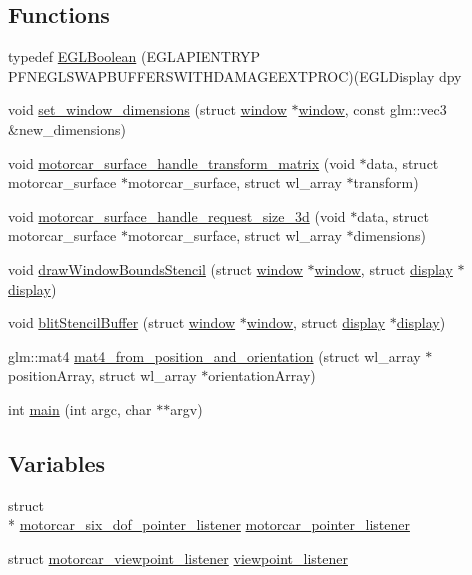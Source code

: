 \subsection*{Functions}
\begin{DoxyCompactItemize}
\item 
typedef \hyperlink{simple-egl_8cpp_ab4ad070d3bf82abe5e70330578f67893}{E\-G\-L\-Boolean} (E\-G\-L\-A\-P\-I\-E\-N\-T\-R\-Y\-P P\-F\-N\-E\-G\-L\-S\-W\-A\-P\-B\-U\-F\-F\-E\-R\-S\-W\-I\-T\-H\-D\-A\-M\-A\-G\-E\-E\-X\-T\-P\-R\-O\-C)(E\-G\-L\-Display dpy
\item 
void \hyperlink{simple-egl_8cpp_aaf6cae69507f2c0964816226ca20c18e}{set\-\_\-window\-\_\-dimensions} (struct \hyperlink{structwindow}{window} $\ast$\hyperlink{structwindow}{window}, const glm\-::vec3 \&new\-\_\-dimensions)
\item 
void \hyperlink{simple-egl_8cpp_a52ad3b6b6e289a4bc6f2886ae41fc37d}{motorcar\-\_\-surface\-\_\-handle\-\_\-transform\-\_\-matrix} (void $\ast$data, struct motorcar\-\_\-surface $\ast$motorcar\-\_\-surface, struct wl\-\_\-array $\ast$transform)
\item 
void \hyperlink{simple-egl_8cpp_aa8d7695f807c4f92f583c3543745ed48}{motorcar\-\_\-surface\-\_\-handle\-\_\-request\-\_\-size\-\_\-3d} (void $\ast$data, struct motorcar\-\_\-surface $\ast$motorcar\-\_\-surface, struct wl\-\_\-array $\ast$dimensions)
\item 
void \hyperlink{simple-egl_8cpp_adb2453327db2ff45639e2da432dc0bda}{draw\-Window\-Bounds\-Stencil} (struct \hyperlink{structwindow}{window} $\ast$\hyperlink{structwindow}{window}, struct \hyperlink{structdisplay}{display} $\ast$\hyperlink{structdisplay}{display})
\item 
void \hyperlink{simple-egl_8cpp_acc3f5d76dc86000e0b46cee5181f2965}{blit\-Stencil\-Buffer} (struct \hyperlink{structwindow}{window} $\ast$\hyperlink{structwindow}{window}, struct \hyperlink{structdisplay}{display} $\ast$\hyperlink{structdisplay}{display})
\item 
glm\-::mat4 \hyperlink{simple-egl_8cpp_a4c7d62d62dce36fb4c180da3649dc755}{mat4\-\_\-from\-\_\-position\-\_\-and\-\_\-orientation} (struct wl\-\_\-array $\ast$position\-Array, struct wl\-\_\-array $\ast$orientation\-Array)
\item 
int \hyperlink{simple-egl_8cpp_a3c04138a5bfe5d72780bb7e82a18e627}{main} (int argc, char $\ast$$\ast$argv)
\end{DoxyCompactItemize}
\subsection*{Variables}
\begin{DoxyCompactItemize}
\item 
struct \\*
\hyperlink{structmotorcar__six__dof__pointer__listener}{motorcar\-\_\-six\-\_\-dof\-\_\-pointer\-\_\-listener} \hyperlink{simple-egl_8cpp_a7bf478b9029897f63d189fc03f9957ad}{motorcar\-\_\-pointer\-\_\-listener}
\item 
struct \hyperlink{structmotorcar__viewpoint__listener}{motorcar\-\_\-viewpoint\-\_\-listener} \hyperlink{simple-egl_8cpp_accee8e06dd6487760ee71ac0c347a035}{viewpoint\-\_\-listener}
\end{DoxyCompactItemize}


